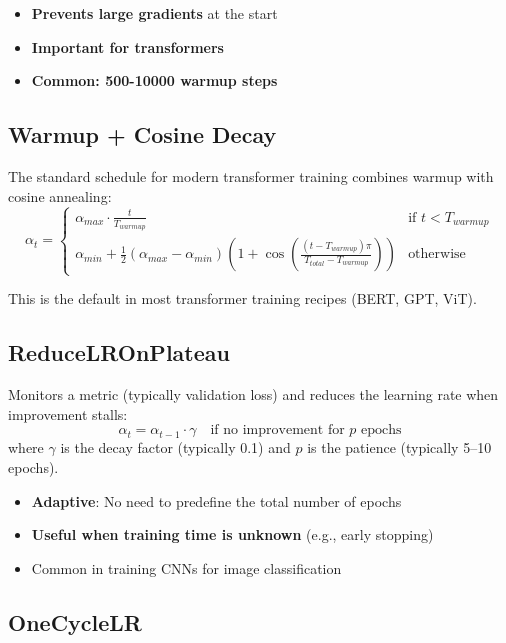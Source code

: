 \begin{itemize}
    \item \textbf{Prevents large gradients} at the start
    \item \textbf{Important for transformers}
    \item \textbf{Common: 500-10000 warmup steps}
\end{itemize}

\subsection{Warmup + Cosine Decay}

The standard schedule for modern transformer training combines warmup with cosine annealing:
\begin{equation}
\alpha_t = \begin{cases}
\alpha_{max} \cdot \frac{t}{T_{warmup}} & \text{if } t < T_{warmup} \\
\alpha_{min} + \frac{1}{2}(\alpha_{max} - \alpha_{min})\left(1 + \cos\left(\frac{(t - T_{warmup})\pi}{T_{total} - T_{warmup}}\right)\right) & \text{otherwise}
\end{cases}
\end{equation}

This is the default in most transformer training recipes (BERT, GPT, ViT).

\subsection{ReduceLROnPlateau}

Monitors a metric (typically validation loss) and reduces the learning rate when improvement stalls:
\begin{equation}
\alpha_t = \alpha_{t-1} \cdot \gamma \quad \text{if } \text{no improvement for } p \text{ epochs}
\end{equation}
where $\gamma$ is the decay factor (typically 0.1) and $p$ is the patience (typically 5--10 epochs).

\begin{itemize}
    \item \textbf{Adaptive}: No need to predefine the total number of epochs
    \item \textbf{Useful when training time is unknown} (e.g., early stopping)
    \item Common in training CNNs for image classification
\end{itemize}

\subsection{OneCycleLR}

